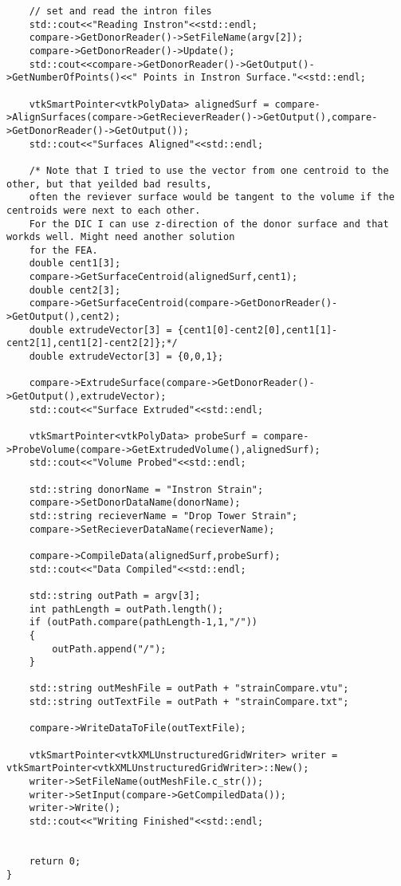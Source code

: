 \begin{lstlisting}
    // set and read the intron files
    std::cout<<"Reading Instron"<<std::endl;
    compare->GetDonorReader()->SetFileName(argv[2]);
    compare->GetDonorReader()->Update();
	std::cout<<compare->GetDonorReader()->GetOutput()->GetNumberOfPoints()<<" Points in Instron Surface."<<std::endl;

    vtkSmartPointer<vtkPolyData> alignedSurf = compare->AlignSurfaces(compare->GetRecieverReader()->GetOutput(),compare->GetDonorReader()->GetOutput());
    std::cout<<"Surfaces Aligned"<<std::endl;

    /* Note that I tried to use the vector from one centroid to the other, but that yeilded bad results,
    often the reviever surface would be tangent to the volume if the centroids were next to each other.
    For the DIC I can use z-direction of the donor surface and that workds well. Might need another solution
    for the FEA.
    double cent1[3];
    compare->GetSurfaceCentroid(alignedSurf,cent1);
    double cent2[3];
    compare->GetSurfaceCentroid(compare->GetDonorReader()->GetOutput(),cent2);
    double extrudeVector[3] = {cent1[0]-cent2[0],cent1[1]-cent2[1],cent1[2]-cent2[2]};*/
    double extrudeVector[3] = {0,0,1};

    compare->ExtrudeSurface(compare->GetDonorReader()->GetOutput(),extrudeVector);
    std::cout<<"Surface Extruded"<<std::endl;

    vtkSmartPointer<vtkPolyData> probeSurf = compare->ProbeVolume(compare->GetExtrudedVolume(),alignedSurf);
    std::cout<<"Volume Probed"<<std::endl;

    std::string donorName = "Instron Strain";
    compare->SetDonorDataName(donorName);
    std::string recieverName = "Drop Tower Strain";
    compare->SetRecieverDataName(recieverName);

    compare->CompileData(alignedSurf,probeSurf);
    std::cout<<"Data Compiled"<<std::endl;

    std::string outPath = argv[3];
    int pathLength = outPath.length();
    if (outPath.compare(pathLength-1,1,"/"))
    {
        outPath.append("/");
    }

    std::string outMeshFile = outPath + "strainCompare.vtu";
    std::string outTextFile = outPath + "strainCompare.txt";

    compare->WriteDataToFile(outTextFile);

    vtkSmartPointer<vtkXMLUnstructuredGridWriter> writer = vtkSmartPointer<vtkXMLUnstructuredGridWriter>::New();
    writer->SetFileName(outMeshFile.c_str());
    writer->SetInput(compare->GetCompiledData());
    writer->Write();
    std::cout<<"Writing Finished"<<std::endl;


	return 0;
}
\end{lstlisting}

